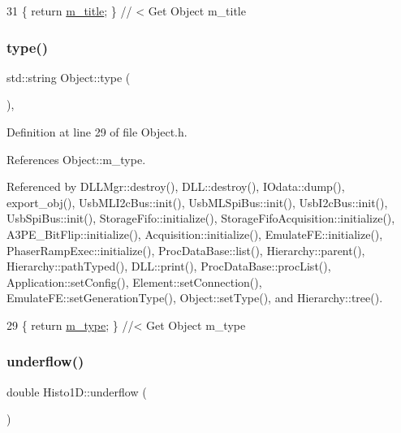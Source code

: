 \begin{DoxyCode}
31 \{ \textcolor{keywordflow}{return} \hyperlink{classObject_affbeea1953eb5163573b92fad8f75727}{m\_title};      \} \textcolor{comment}{// < Get Object m\_title}
\end{DoxyCode}
\mbox{\label{classObject_a84f99f70f144a83e1582d1d0f84e4e62}} 
\subsubsection{\texorpdfstring{type()}{type()}}
{\footnotesize\ttfamily std\+::string Object\+::type (\begin{DoxyParamCaption}{ }\end{DoxyParamCaption})\hspace{0.3cm}{\ttfamily [inline]}, {\ttfamily [inherited]}}



Definition at line 29 of file Object.\+h.



References Object\+::m\+\_\+type.



Referenced by D\+L\+L\+Mgr\+::destroy(), D\+L\+L\+::destroy(), I\+Odata\+::dump(), export\+\_\+obj(), Usb\+M\+L\+I2c\+Bus\+::init(), Usb\+M\+L\+Spi\+Bus\+::init(), Usb\+I2c\+Bus\+::init(), Usb\+Spi\+Bus\+::init(), Storage\+Fifo\+::initialize(), Storage\+Fifo\+Acquisition\+::initialize(), A3\+P\+E\+\_\+\+Bit\+Flip\+::initialize(), Acquisition\+::initialize(), Emulate\+F\+E\+::initialize(), Phaser\+Ramp\+Exec\+::initialize(), Proc\+Data\+Base\+::list(), Hierarchy\+::parent(), Hierarchy\+::path\+Typed(), D\+L\+L\+::print(), Proc\+Data\+Base\+::proc\+List(), Application\+::set\+Config(), Element\+::set\+Connection(), Emulate\+F\+E\+::set\+Generation\+Type(), Object\+::set\+Type(), and Hierarchy\+::tree().


\begin{DoxyCode}
29 \{ \textcolor{keywordflow}{return} \hyperlink{classObject_a457a600fe8c00eb1034374f75110a78c}{m\_type};       \} \textcolor{comment}{//< Get Object m\_type}
\end{DoxyCode}
\mbox{\label{classHisto1D_a3bac7a207b9ed5f828001119b2f14869}} 
\subsubsection{\texorpdfstring{underflow()}{underflow()}}
{\footnotesize\ttfamily double Histo1\+D\+::underflow (\begin{DoxyParamCaption}{ }\end{DoxyParamCaption})\hspace{0.3cm}{\ttfamily [inline]}}



